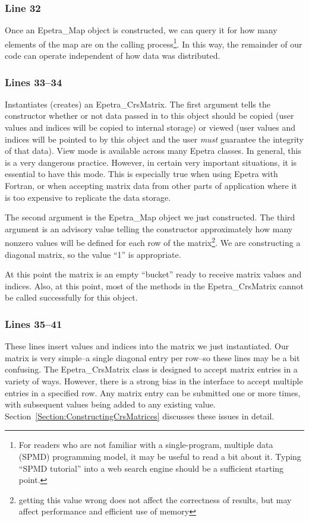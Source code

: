 \documentclass[12pt,relax]{EpetraUserGuide}
\newcommand{\map}{Epetra\_Map}
\newcommand{\crsmatrix}{Epetra\_CrsMatrix}
\begin{document}
\subsubsection{Line 32}
Once an \map{} object is constructed, we can query it for how many
elements of the map are on the calling process\footnote{For readers
who are not familiar with a single-program, multiple data (SPMD)
programming model, it may be useful to read a bit about it.  Typing
``SPMD tutorial'' into a web search engine should be a sufficient
starting point.}.  In this way, the remainder of our code can operate
independent of how data was distributed.
\subsubsection{Lines 33--34}
Instantiates (creates) an \crsmatrix{}.  The first argument tells the
constructor whether or not data passed in to this object should be
copied (user values and indices will be copied to internal storage) or
viewed (user values and indices will be pointed to by this object and
the user {\it must} guarantee the integrity of that data).  View mode
is available across many Epetra classes.  In general, this is a very
dangerous practice.  However, in certain very important situations, it
is essential to have this mode.  This is especially true when using
Epetra with Fortran, or when accepting matrix data from other parts of
application where it is too expensive to replicate the data storage.

The second argument is the \map{} object we just constructed.  The
third argument is an advisory value telling the constructor
approximately how many nonzero values will be defined for each row of
the matrix\footnote{getting this value wrong does not
affect the correctness of results, but may affect performance and
efficient use of memory}.  We are constructing a diagonal matrix, so the value ``1''
is appropriate.

At this point the matrix is an empty ``bucket'' ready to receive
matrix values and indices.  Also, at this point, most of the methods
in the \crsmatrix{} cannot be called successfully for this object.
\subsubsection{Lines 35--41}
These lines insert values and indices into the matrix we just
instantiated.  Our matrix is very simple--a single diagonal entry per
row--so these lines may be a bit confusing.  The \crsmatrix{} class is
designed to accept matrix entries in a variety of ways.  However,
there is a strong bias in the interface to accept multiple entries in
a specified row.  Any matrix entry can be submitted one or more times,
with subsequent values being added to any existing value.
Section~\ref{Section:ConstructingCrsMatrices} discusses these issues
in detail.
\end{document}
